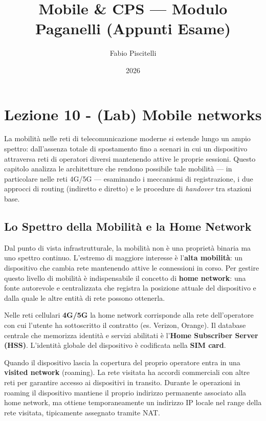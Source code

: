 \documentclass[
  italian,
  openany]{book}
\title{Mobile \& CPS --- Modulo Paganelli (Appunti Esame)}
\author{Fabio Piscitelli}
\date{2026}
\begin{document}
\frontmatter
\maketitle

{
\setcounter{tocdepth}{1}
\tableofcontents
}
\mainmatter
\chapter{Lezione 10 - (Lab) Mobile
networks}\label{lezione-10---lab-mobile-networks}

La mobilità nelle reti di telecomunicazione moderne si estende lungo un
ampio spettro: dall'assenza totale di spostamento fino a scenari in cui
un dispositivo attraversa reti di operatori diversi mantenendo attive le
proprie sessioni. Questo capitolo analizza le architetture che rendono
possibile tale mobilità --- in particolare nelle reti 4G/5G ---
esaminando i meccanismi di registrazione, i due approcci di routing
(indiretto e diretto) e le procedure di \emph{handover} tra stazioni
base.

\section{Lo Spettro della Mobilità e la Home
Network}\label{lo-spettro-della-mobilituxe0-e-la-home-network}

Dal punto di vista infrastrutturale, la mobilità non è una proprietà
binaria ma uno spettro continuo. L'estremo di maggiore interesse è
l'\textbf{alta mobilità}: un dispositivo che cambia rete mantenendo
attive le connessioni in corso. Per gestire questo livello di mobilità è
indispensabile il concetto di \textbf{home network}: una fonte
autorevole e centralizzata che registra la posizione attuale del
dispositivo e dalla quale le altre entità di rete possono ottenerla.

Nelle reti cellulari \textbf{4G/5G} la home network corrisponde alla
rete dell'operatore con cui l'utente ha sottoscritto il contratto (es.
Verizon, Orange). Il database centrale che memorizza identità e servizi
abilitati è l'\textbf{Home Subscriber Server (HSS)}. L'identità globale
del dispositivo è codificata nella \textbf{SIM card}.

Quando il dispositivo lascia la copertura del proprio operatore entra in
una \textbf{visited network} (roaming). La rete visitata ha accordi
commerciali con altre reti per garantire accesso ai dispositivi in
transito. Durante le operazioni in roaming il dispositivo mantiene il
proprio indirizzo permanente associato alla home network, ma ottiene
temporaneamente un indirizzo IP locale nel range della rete visitata,
tipicamente assegnato tramite NAT.
\end{document}
